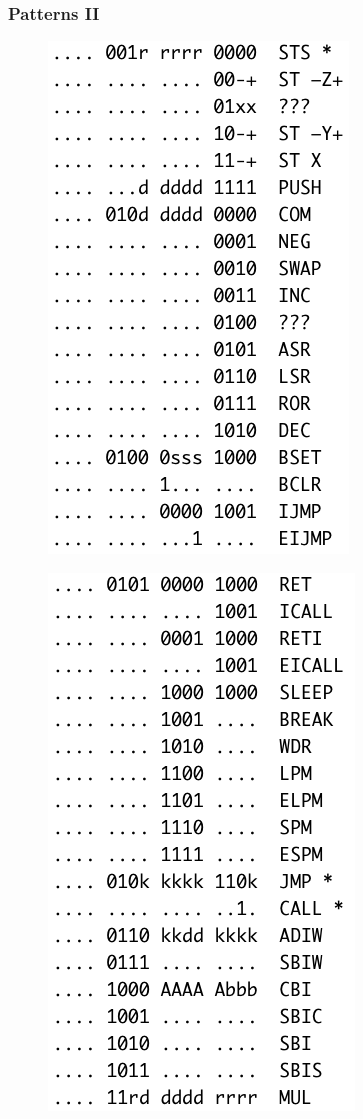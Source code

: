 \documentclass{beamer}
\begin{document}
\begin{frame}
\frametitle{Patterns II}
\begin{multicols}{2}
\begin{figure}
	\includegraphics[scale=0.36]{screen3.png}
\end{figure}
\begin{figure}
	\includegraphics[scale=0.36]{screen4.png}
\end{figure}
\end{multicols}
\end{frame}
\end{document}
